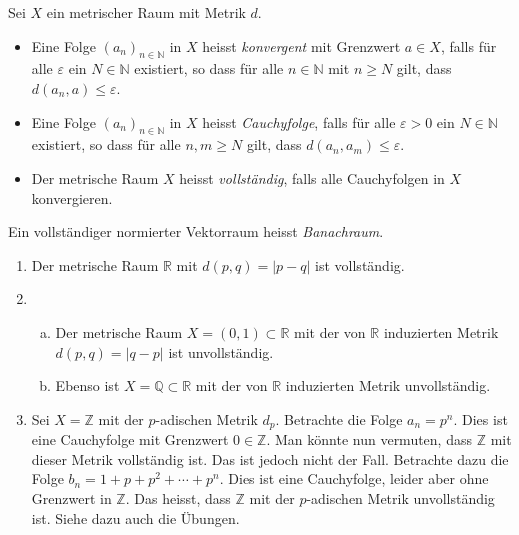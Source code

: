 \documentclass[../main.tex]{subfiles}
\begin{document}
\newpage

\begin{definitions}
  Sei $X$ ein metrischer Raum mit Metrik $d$.
  \begin{itemize}
    \item Eine Folge ${(a_{n})}_{n \in \mathbb{N}}$ in
      $X$ heisst \emph{konvergent} mit Grenzwert
      $a \in X$, falls für alle $\varepsilon$
      ein $N \in \mathbb{N}$ existiert,
      so dass für alle $n \in \mathbb{N}$ mit $n \geq N$
      gilt, dass $d(a_n, a) \leq \varepsilon$.
    \item Eine Folge ${(a_{n})}_{n \in \mathbb{N}}$ in $X$
      heisst \emph{Cauchyfolge}, falls für alle $\varepsilon > 0$
      ein $N \in \mathbb{N}$ existiert, so dass für
      alle $n, m \geq N$ gilt, dass
      $d(a_n, a_m) \leq \varepsilon$.
    \item Der metrische Raum $X$ heisst \emph{vollständig},
      falls alle Cauchyfolgen in $X$ konvergieren.
  \end{itemize}
  Ein vollständiger normierter Vektorraum heisst \emph{Banachraum}.
\end{definitions}

\begin{examples}
  \leavevmode
  \begin{enumerate}[(1)]
    \item Der metrische Raum $\mathbb{R}$ mit $d(p, q) = |p - q|$
      ist vollständig.
    \item
      \begin{enumerate}[(a)]
        \item Der metrische Raum $X = (0, 1) \subset \mathbb{R}$
          mit der von $\mathbb{R}$ induzierten
          Metrik $d(p, q) = |q - p|$ ist unvollständig.
        \item Ebenso ist $X = \mathbb{Q} \subset \mathbb{R}$ mit
           der von $\mathbb{R}$ induzierten Metrik unvollständig.
      \end{enumerate}
    \item Sei $X = \mathbb{Z}$ mit der $p$-adischen Metrik $d_p$.
      Betrachte die Folge $a_n = p^n$.
      Dies ist eine Cauchyfolge mit Grenzwert $0 \in \mathbb{Z}$.
      Man könnte nun vermuten, dass $\mathbb{Z}$ mit dieser
      Metrik vollständig ist. Das ist jedoch nicht der Fall.
      Betrachte dazu die Folge $b_n = 1 + p + p^2 + \cdots + p^n$.
      Dies ist eine Cauchyfolge, leider aber ohne Grenzwert
      in $\mathbb{Z}$.
      Das heisst, dass $\mathbb{Z}$ mit der $p$-adischen Metrik
      unvollständig ist. Siehe dazu auch die Übungen.
  \end{enumerate}
\end{examples}
\end{document}
